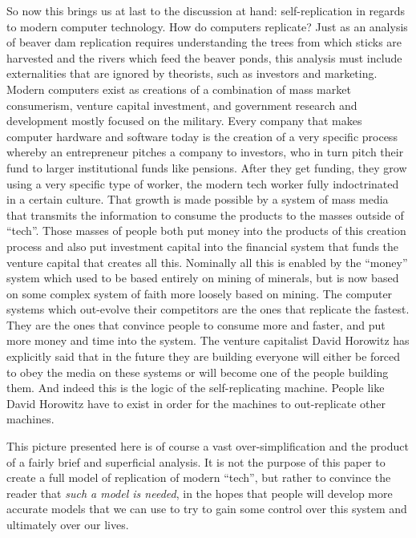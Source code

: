 \documentclass[12pt,a4paper]{amsart}
\numberwithin{equation}{section}
\begin{document}
So now this brings us at last to the discussion at hand:
self-replication in regards to modern computer technology. How do
computers replicate? Just as an analysis of beaver dam replication
requires understanding the trees from which sticks are harvested and the
rivers which feed the beaver ponds, this analysis must include
externalities that are ignored by theorists, such as investors and
marketing. Modern computers exist as creations of a combination of mass
market consumerism, venture capital investment, and government research
and development mostly focused on the military. Every company that makes
computer hardware and software today is the creation of a very specific
process whereby an entrepreneur pitches a company to investors, who in
turn pitch their fund to larger institutional funds like pensions. After
they get funding, they grow using a very specific type of worker, the
modern tech worker fully indoctrinated in a certain culture. That growth
is made possible by a system of mass media that transmits the
information to consume the products to the masses outside of ``tech''.
Those masses of people both put money into the products of this creation
process and also put investment capital into the financial system that
funds the venture capital that creates all this. Nominally all this is
enabled by the ``money'' system which used to be based entirely on
mining of minerals, but is now based on some complex system of faith
more loosely based on mining. The computer systems which out-evolve
their competitors are the ones that replicate the fastest. They are the
ones that convince people to consume more and faster, and put more money
and time into the system. The venture capitalist David Horowitz has
explicitly said that in the future they are building everyone will
either be forced to obey the media on these systems or will become one
of the people building them. And indeed this is the logic of the
self-replicating machine. People like David Horowitz have to exist in
order for the machines to out-replicate other machines.

This picture presented here is of course a vast over-simplification and
the product of a fairly brief and superficial analysis. It is not the
purpose of this paper to create a full model of replication of modern
``tech'', but rather to convince the reader that \emph{such a model is
needed}, in the hopes that people will develop more accurate models that
we can use to try to gain some control over this system and ultimately
over our lives.
\end{document}
